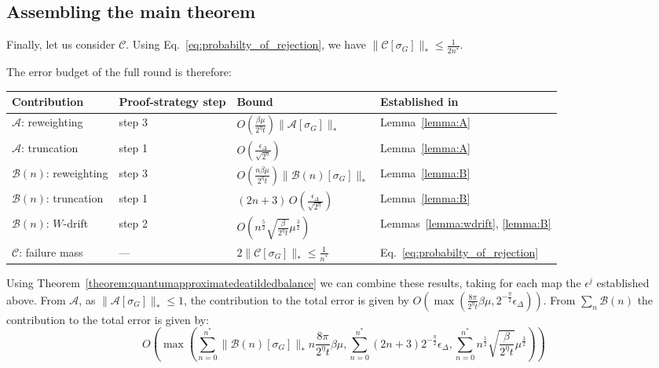 \documentclass[aps,floatfix,10pt,amssymb,amsfont,amsmath,superscriptaddress,float,nofootinbib,longbibliography,nobalancelastpage,twocolumn]{revtex4-2}
\begin{document}
\subsection{Assembling the main theorem}
\label{subsec:assembly}
\begin{widetext}
Finally, let us consider $\mathcal{C}$. Using Eq.~\eqref{eq:probabilty_of_rejection}, we have $\|\mathcal{C}[\sigma_G]\|_{*}\leq\frac{1}{2n^*}$.

The error budget of the full round is therefore:
\begin{center}
\begin{tabular}{llll}
\hline\hline
Contribution & Proof-strategy step & Bound & Established in \\
\hline
$\mathcal{A}$: reweighting & step 3 & $O(\frac{\beta\mu}{2^{\eta}t})\|\mathcal{A}[\sigma_G]\|_*$ & Lemma~\ref{lemma:A} \\
$\mathcal{A}$: truncation & step 1 & $O(\frac{\epsilon_{\Delta}}{\sqrt{2^{\eta}}})$ & Lemma~\ref{lemma:A} \\
$\mathcal{B}(n)$: reweighting & step 3 & $O(\frac{n\beta\mu}{2^{\eta}t})\|\mathcal{B}(n)[\sigma_G]\|_*$ & Lemma~\ref{lemma:B} \\
$\mathcal{B}(n)$: truncation & step 1 & $(2n+3)\,O(\frac{\epsilon_{\Delta}}{\sqrt{2^{\eta}}})$ & Lemma~\ref{lemma:B} \\
$\mathcal{B}(n)$: $W$-drift & step 2 & $O(n^{\frac{5}{2}}\sqrt{\frac{\beta}{2^{\eta}t}}\mu^{\frac{3}{2}})$ & Lemmas~\ref{lemma:wdrift}, \ref{lemma:B} \\
$\mathcal{C}$: failure mass & --- & $2\|\mathcal{C}[\sigma_G]\|_* \leq \frac{1}{n^*}$ & Eq.~\eqref{eq:probabilty_of_rejection} \\
\hline\hline
\end{tabular}
\end{center}
Using Theorem~\ref{theorem:quantumapproximatedeatildedbalance} we can combine these results, taking for each map the $\epsilon^j$ established above. From $\mathcal{A}$, as $\|\mathcal{A}[\sigma_G]\|_* \leq 1$, the contribution to the total error is given by $O(\max(\frac{8\pi}{2^{\eta}t}\beta\mu,2^{-\frac{\eta}{2}}\epsilon_{\Delta}))$. From $\sum_n\mathcal{B}(n)$ the contribution to the total error is given by:
\begin{equation}
    O\!\left(\max\!\left(\sum_{n=0}^{n^*}\|\mathcal B(n)[\sigma_G]\|_* n\frac{8\pi}{2^{\eta}t}\beta \mu,
    \sum_{n=0}^{n^*}(2n+3)2^{-\frac{\eta}{2}}\epsilon_{\Delta}, \sum_{n=0}^{n^*}n^{\frac{5}{2}}\sqrt{\frac{\beta }{2^{\eta}t}}\mu^{\frac{3}{2}}\right)\right)

\end{equation}
\end{widetext}
\end{document}
